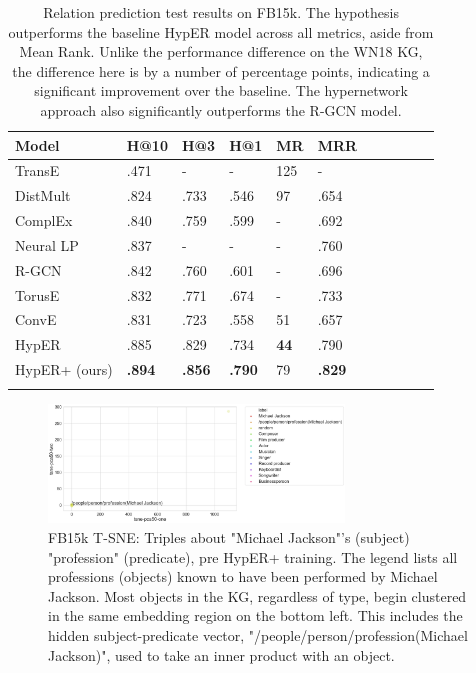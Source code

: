 \begin{table}
		\centering
		\begin{tabular}{lllllllllll}
  			\textbf{Model} & \textbf{H@10} & \textbf{H@3} & \textbf{H@1} & \textbf{MR} & \textbf{MRR} \\
  			\hline
  			TransE \unskip~\citep{bordes2013translating} & .471 & - & - & 125 & - \\
  			DistMult \unskip~\citep{yang2014embedding} & .824 & .733 & .546 & 97 & .654 \\
  			ComplEx \unskip~\citep{trouillon2016complex} & .840 & .759 & .599 & - & .692 \\
  			Neural LP \unskip~\citep{yang2017differentiable} & .837 & - & - & - & .760 \\
			R-GCN \unskip~\citep{schlichtkrull2018modeling} & .842 & .760 & .601 & - & .696 \\
			TorusE \unskip~\citep{ebisu2018toruse} & .832 & .771 & .674 & - & .733\\
			ConvE \unskip~\citep{dettmers2018convolutional} & .831 & .723 & .558 & 51 & .657 \\
			HypER \unskip~\citep{balazevic2019hypernetwork} & .885 & .829 & .734 & \textbf{44} & .790 \\
  			\hline
  			HypER+ (ours) & \textbf{.894} & \textbf{.856} & \textbf{.790} & 79 & \textbf{.829} \\
			&
		\end{tabular}
		\captionsetup{justification=centering}
		\caption{Relation prediction test results on FB15k. The hypothesis outperforms the baseline HypER model across all metrics, aside from Mean Rank. Unlike the performance difference on the WN18 KG, the difference here is by a number of percentage points, indicating a significant improvement over the baseline. The hypernetwork approach also significantly outperforms the R-GCN model.}
\end{table}



\begin{figure}
   	\centering
    	\includegraphics[width=0.7\textwidth, height=0.3\textheight]{t_sne_train_profession}
	\captionsetup{justification=centering}
	\caption{FB15k T-SNE: Triples about "Michael Jackson"'s (subject) "profession" (predicate), pre HypER+ training. The legend lists all professions (objects) known to have been performed by Michael Jackson. Most objects in the KG, regardless of type, begin clustered in the same embedding region on the bottom left. This includes the hidden subject-predicate vector,  "/people/person/profession(Michael Jackson)", used to take an inner product with an object.}
\end{figure}

